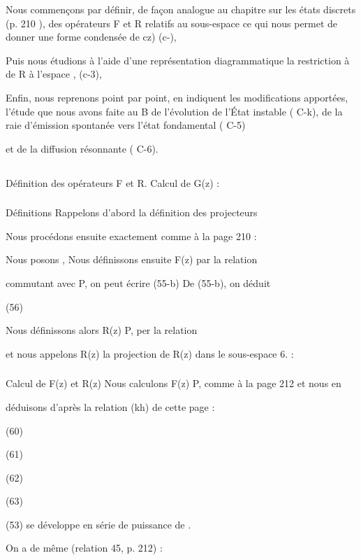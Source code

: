 Nous commençons par définir, de façon analogue au chapitre sur
les états discrets (p. 210 ), des opérateurs F et R relatifs au sous-espace 
ce qui nous permet de donner une forme condensée de cz) (c-),

Puis nous étudions à l'aide d'une représentation diagrammatique
la restriction à de R à l'espace , (c-3),

Enfin, nous reprenons point par point, en indiquent les modifications apportées, l'étude que nous avons faite au  B de l'évolution de l'État instable ( C-k), de la raie d'émission spontanée vers l'état fondamental ( C-5)

et de la diffusion résonnante ( C-6).


\subsection{} Définition des opérateurs F et R. Calcul de G(z) :%
\subsubsection{} Définitions Rappelons d'abord la définition des projecteurs%

Nous procédons ensuite exactement comme à la page 210 :

Nous posons
,
Nous définissons ensuite F(z) par la relation

commutant avec P, on peut écrire
(55-b)
De (55-b), on déduit

(56)

Nous définissons alors R(z) P, per la relation

et nous appelons R(z) la projection de R(z) dans le sous-espace 6. :

\subsubsection{} Calcul de F(z) et R(z)%
Nous calculons F(z) P, comme à la page 212 et nous en

déduisons d'après la relation (kh) de cette page :

(60)

(61)

(62)

(63)


(53) se développe en série de puissance de .

On a de même (relation 45, p. 212) :

